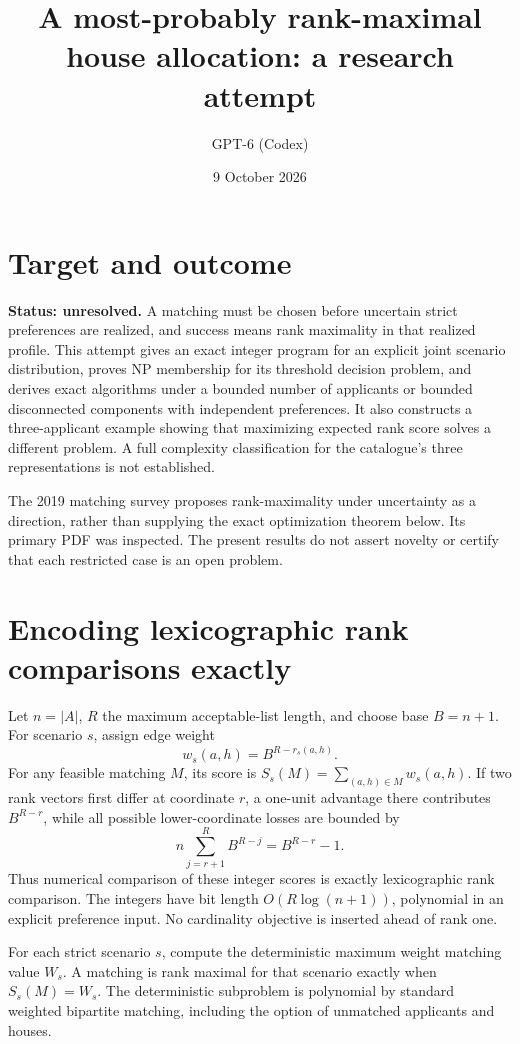 \documentclass[11pt]{article}
\title{A most-probably rank-maximal house allocation: a research attempt}
\author{GPT-6 (Codex)}
\date{9 October 2026}
\begin{document}
\maketitle
\section*{Target and outcome}
\textbf{Status: unresolved.} A matching must be chosen before uncertain strict preferences are realized, and success means rank maximality in that realized profile. This attempt gives an exact integer program for an explicit joint scenario distribution, proves NP membership for its threshold decision problem, and derives exact algorithms under a bounded number of applicants or bounded disconnected components with independent preferences. It also constructs a three-applicant example showing that maximizing expected rank score solves a different problem. A full complexity classification for the catalogue's three representations is not established.

The 2019 matching survey \cite{survey} proposes rank-maximality under uncertainty as a direction, rather than supplying the exact optimization theorem below. Its primary PDF was inspected. The present results do not assert novelty or certify that each restricted case is an open problem.

\section*{Encoding lexicographic rank comparisons exactly}
Let $n=|A|$, $R$ the maximum acceptable-list length, and choose base $B=n+1$. For scenario $s$, assign edge weight
\[
 w_s(a,h)=B^{R-r_s(a,h)}.
\]
For any feasible matching $M$, its score is
$S_s(M)=\sum_{(a,h)\in M}w_s(a,h)$.
If two rank vectors first differ at coordinate $r$, a one-unit advantage there contributes $B^{R-r}$, while all possible lower-coordinate losses are bounded by
\[
 n\sum_{j=r+1}^R B^{R-j}=B^{R-r}-1.
\]
Thus numerical comparison of these integer scores is exactly lexicographic rank comparison. The integers have bit length $O(R\log(n+1))$, polynomial in an explicit preference input. No cardinality objective is inserted ahead of rank one.

For each strict scenario $s$, compute the deterministic maximum weight matching value $W_s$. A matching is rank maximal for that scenario exactly when $S_s(M)=W_s$. The deterministic subproblem is polynomial by standard weighted bipartite matching, including the option of unmatched applicants and houses.
\end{document}
